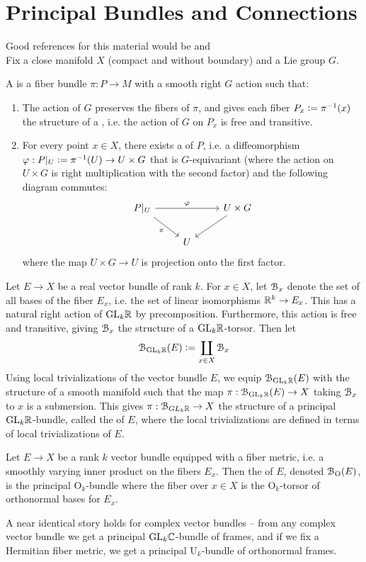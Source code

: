 %
\section{Principal Bundles and Connections}
%
Good references for this material would be \cite{KobNom} and \cite{Tu} \\

Fix a close manifold $X$ (compact and without boundary) and a Lie group $G$.
%
\begin{defn}
A  is a fiber bundle $\pi : P \to M$ with a smooth
right $G$ action such that:
\begin{enumerate}
  \item The action of $G$ preserves the fibers of $\pi$, and gives each fiber
  $P_x \vcentcolon= \pi^{-1}(x)$ the structure of a , i.e. the
  action of $G$ on $P_x$ is free and transitive.
  \item For every point $x \in X$, there exists a  of
  $P$, i.e. a diffeomorphism $\varphi : P\vert_U \vcentcolon= \pi^{-1}(U) \to U \times G$
  that is $G$-equivariant (where the action on $U \times G$ is right multiplication
  with the second factor) and the following diagram commutes:
  \[\begin{tikzcd}
  P\vert_U \ar[rr, "\varphi"] \ar[dr, "\pi"'] && U \times G \ar[dl] \\
  & U
  \end{tikzcd}\]
  where the map $U\times G \to U$ is projection onto the first factor.
\end{enumerate}
\end{defn}
%
\begin{exmp}
Let $E \to X$ be a real vector bundle of rank $k$. For $x \in X$, let $\mathcal{B}_x$
denote the set of all bases of the fiber $E_x$, i.e. the set of linear isomorphisms
$\mathbb{R}^k \to E_x$. This has a natural right action of $\mathrm{GL}_k\mathbb{R}$ by precomposition.
Furthermore, this action is free and transitive, giving $\mathcal{B}_x$ the structure
of a $\mathrm{GL}_k\mathbb{R}$-torsor. Then let
\[
\mathcal{B}_{\mathrm{GL}_k\mathbb{R}}(E) \vcentcolon= \coprod_{x \in X}\mathcal{B}_x
\]
Using local trivializations of the vector bundle $E$, we equip $\mathcal{B}_{\mathrm{GL}_k\mathbb{R}}(E)$
with the structure of a smooth manifold such that the map
$\pi : \mathcal{B}_{\mathrm{GL}_k\mathbb{R}}(E) \to X$ taking $\mathcal{B}_x$ to $x$ is a submersion. This gives
$\pi : \mathcal{B}_{GL_k\mathbb{R}} \to X$ the structure of a principal $\mathrm{GL}_k\mathbb{R}$-bundle, called
the  of $E$,  where the local trivializations are defined in terms of
local trivializations of $E$.
\end{exmp}
%
\begin{exmp}
Let $E \to X$ be a rank $k$ vector bundle equipped with a fiber metric, i.e. a
smoothly  varying inner product on the fibers $E_x$. Then the
 of $E$, denoted $\mathcal{B}_{\mathrm{O}}(E)$, is the principal
$\mathrm{O}_k$-bundle where the fiber over $x \in X$ is the $\mathrm{O}_k$-torsor
of orthonormal bases for $E_x$.
\end{exmp}
%
A near identical story holds for complex vector bundles -- from any complex
vector bundle we get a principal $\mathrm{GL}_k\mathbb{C}$-bundle of frames, and if
we fix a Hermitian fiber metric, we get a principal $\mathrm{U}_k$-bundle of
orthonormal frames. \\

